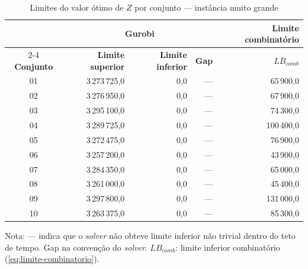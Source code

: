 \begin{table}[htbp]
    \caption{Limites do valor ótimo de $Z$ por conjunto --- instância muito grande}
    \label{tab:res-limites-muito-grande}
    \centering
    \begin{tabular}{crrrr}
        \hline
        & \multicolumn{3}{c}{\textbf{Gurobi}} & \textbf{Limite combinatório} \\
        \cline{2-4} \cline{5-5}
        \textbf{Conjunto} & \textbf{Limite superior} & \textbf{Limite inferior} & \textbf{Gap} & \textbf{$LB_{comb}$} \\
        \hline
        01 & 3\,273\,725,0 & 0,0 & --- & 65\,900,0 \\
        02 & 3\,276\,950,0 & 0,0 & --- & 67\,900,0 \\
        03 & 3\,295\,100,0 & 0,0 & --- & 74\,300,0 \\
        04 & 3\,289\,725,0 & 0,0 & --- & 100\,400,0 \\
        05 & 3\,272\,475,0 & 0,0 & --- & 76\,900,0 \\
        06 & 3\,257\,200,0 & 0,0 & --- & 43\,900,0 \\
        07 & 3\,284\,350,0 & 0,0 & --- & 65\,000,0 \\
        08 & 3\,261\,000,0 & 0,0 & --- & 45\,400,0 \\
        09 & 3\,297\,800,0 & 0,0 & --- & 131\,000,0 \\
        10 & 3\,263\,375,0 & 0,0 & --- & 85\,300,0 \\
        \hline
    \end{tabular}
    \par\smallskip
    {\footnotesize Nota: --- indica que o \textit{solver} não obteve limite inferior não trivial dentro do teto de tempo. Gap na convenção do \textit{solver}. $LB_{comb}$: limite inferior combinatório (\autoref{eq:limite-combinatorio}).}
\end{table}

